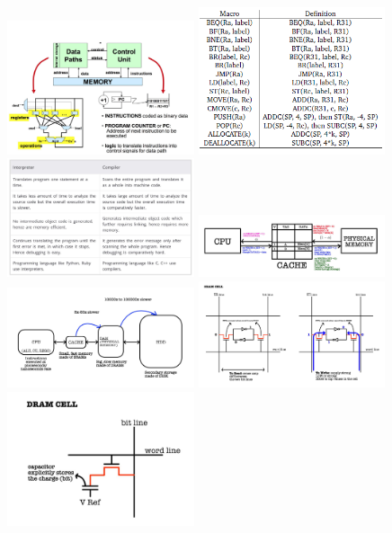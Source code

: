 \documentclass[8pt,landscape]{extarticle}
\begin{document}
\begin{multicols*}{5}
\includegraphics[width = 5.5cm]{CPU_anatomy}
\includegraphics[width = 5.5cm]{Macro}
\includegraphics[width = 5.5cm]{Interpreter_Compiler}
\includegraphics[width = 5.5cm]{Cache_algo}
\includegraphics[width = 5.5cm]{MemoryHierarchy}
\includegraphics[width = 5.5cm]{SRAM_cell}
\includegraphics[width = 5.5cm]{DRAM_cell}

\end{multicols*}
\end{document}

